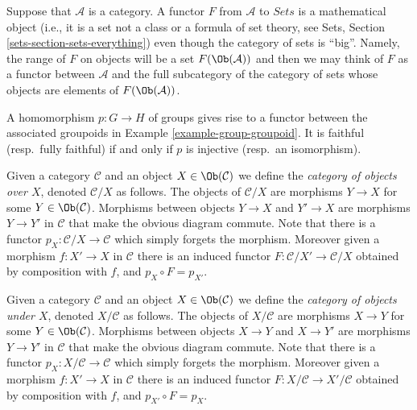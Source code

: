 \begin{remark}
\label{remark-functor-into-sets}
Suppose that $\mathcal{A}$ is a category.
A functor $F$ from $\mathcal{A}$ to $\textit{Sets}$
is a mathematical object (i.e., it is a set not a class or a formula
of set theory, see
Sets, Section \ref{sets-section-sets-everything})
even though the category of sets is ``big''.
Namely, the range of $F$ on objects will be
a set $F(\Ob(\mathcal{A}))$ and then we
may think of $F$ as a functor between
$\mathcal{A}$ and the full subcategory
of the category of sets whose
objects are elements of $F(\Ob(\mathcal{A}))$.
\end{remark}

\begin{example}
\label{example-group-homomorphism-functor}
A homomorphism $p : G\to H$ of groups gives rise to a functor
between the associated groupoids in Example \ref{example-group-groupoid}. It is
faithful (resp.\ fully faithful) if and only if $p$ is injective (resp.\ an
isomorphism).
\end{example}

\begin{example}
\label{example-category-over-X}
Given a category $\mathcal{C}$ and an object $X\in \Ob(\mathcal{C})$
we define the {\it category of objects over $X$},
denoted $\mathcal{C}/X$ as follows.
The objects of $\mathcal{C}/X$ are morphisms $Y\to X$ for
some $Y\in \Ob(\mathcal{C})$. Morphisms between objects
$Y\to X$ and $Y'\to X$ are morphisms $Y\to Y'$ in $\mathcal{C}$ that
make the obvious diagram commute. Note that there is a functor
$p_X : \mathcal{C}/X\to \mathcal{C}$ which simply forgets the
morphism. Moreover given a morphism $f : X'\to X$ in
$\mathcal{C}$ there is an induced functor
$F : \mathcal{C}/X' \to \mathcal{C}/X$ obtained by composition with $f$,
and $p_X\circ F = p_{X'}$.
\end{example}

\begin{example}
\label{example-category-under-X}
Given a category $\mathcal{C}$ and an object $X\in \Ob(\mathcal{C})$
we define the {\it category of objects under $X$},
denoted $X/\mathcal{C}$ as follows.
The objects of $X/\mathcal{C}$ are morphisms $X\to Y$ for
some $Y\in \Ob(\mathcal{C})$. Morphisms between objects
$X\to Y$ and $X\to Y'$ are morphisms $Y\to Y'$ in $\mathcal{C}$ that
make the obvious diagram commute. Note that there is a functor
$p_X : X/\mathcal{C}\to \mathcal{C}$ which simply forgets the
morphism. Moreover given a morphism $f : X'\to X$ in
$\mathcal{C}$ there is an induced functor
$F : X/\mathcal{C} \to X'/\mathcal{C}$
obtained by composition with $f$,
and $p_{X'}\circ F = p_X$.
\end{example}




